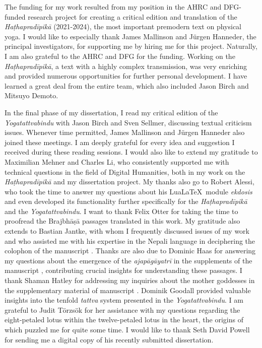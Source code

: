 The funding for my work resulted from my position in the AHRC and DFG-funded research project for creating a critical edition and translation of the \emph{Haṭhapradīpikā} (2021-2024), the most important premodern text on physical yoga. I would like to especially thank James Mallinson and Jürgen Hanneder, the principal investigators, for supporting me by hiring me for this project. Naturally, I am also grateful to the AHRC and DFG for the funding. Working on the \emph{Haṭhapradīpikā}, a text with a highly complex transmission, was very enriching and provided numerous opportunities for further personal development. I have learned a great deal from the entire team, which also included Jason Birch and Mitsuyo Demoto.

In the final phase of my dissertation, I read my critical edition of the \emph{Yogatattvabindu} with Jason Birch and Sven Sellmer, discussing textual criticism issues. Whenever time permitted, James Mallinson and Jürgen Hanneder also joined these meetings. I am deeply grateful for every idea and suggestion I received during these reading sessions. I would also like to extend my gratitude to Maximilian Mehner and Charles Li, who consistently supported me with technical questions in the field of Digital Humanities, both in my work on the \textit{Haṭhapradīpikā} and my dissertation project. My thanks also go to Robert Alessi, who took the time to answer my questions about his Lua\LaTeX\ module \textit{ekdosis} and even developed its functionality further specifically for the \textit{Haṭhapradīpikā} and the \emph{Yogatattvabindu}.
I want to thank Felix Otter for taking the time to proofread the Brajbhāṣā passages translated in this work. My gratitude also extends to Bastian Jantke, with whom I frequently discussed issues of my work and who assisted me with his expertise in the Nepali language in deciphering the colophon of the manuscript . Thanks are also due to Dominic Haas for answering my questions about the emergence of the \textit{ajapāgāyatrī} in the supplements of the manuscript , contributing crucial insights for understanding these passages. I thank Shaman Hatley for addressing my inquiries about the mother goddesses in the supplementary material of manuscript . Dominik Goodall provided valuable insights into the tenfold \textit{tattva} system presented in the \emph{Yogatattvabindu}. I am grateful to Judit Törzsök for her assistance with my questions regarding the eight-petaled lotus within the twelve-petaled lotus in the heart, the origins of which puzzled me for quite some time. I would like to thank Seth David Powell for sending me a digital copy of his recently submitted dissertation. 
